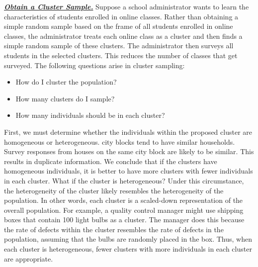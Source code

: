 \documentclass{report}
\begin{document}
        \pagebreak \bigbreak \noindent
        \textbf{\textit{\underline{Obtain a Cluster Sample.}}}
        \bigbreak \noindent 
        Suppose a school administrator wants to learn the characteristics of students enrolled in online classes. Rather than obtaining a simple random sample based on the frame of all students enrolled in online classes, the administrator treats each online class as a cluster and then finds a simple random sample of these clusters. The administrator then surveys all students in the selected clusters. This reduces the number of classes that get surveyed.
        \bigbreak \noindent 
        The following questions arise in cluster sampling:
        \begin{itemize}
            \item How do I cluster the population?
            \item How many clusters do I sample?
            \item How many individuals should be in each cluster?
        \end{itemize}
        \bigbreak \noindent 
        First, we must determine whether the individuals within the proposed cluster are homogeneous or heterogeneous.
        \bigbreak \noindent 
        city blocks tend to have similar households. Survey responses from houses on the same city block are likely to be similar. This results in duplicate information. We conclude that if the clusters have homogeneous individuals, it is better to have more clusters with fewer individuals in each cluster.
        \bigbreak \noindent 
        What if the cluster is heterogeneous? Under this circumstance, the heterogeneity of the cluster likely resembles the heterogeneity of the population. In other words, each cluster is a scaled-down representation of the overall population.
        \bigbreak \noindent 
        For example, a quality control manager might use shipping boxes that contain 100 light bulbs as a cluster. The manager does this because the rate of defects within the cluster resembles the rate of defects in the population, assuming that the bulbs are randomly placed in the box. Thus, when each cluster is heterogeneous, fewer clusters with more individuals in each cluster are appropriate.
\end{document}
